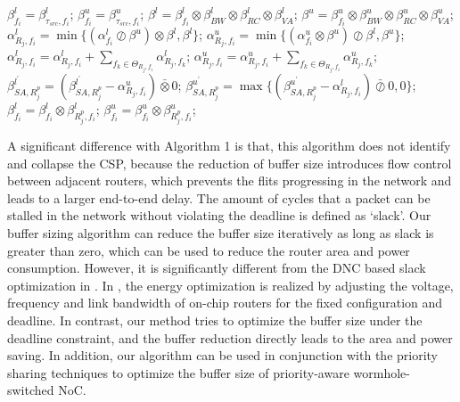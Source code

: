 \documentclass[10pt,journal]{IEEEtran}
\begin{document}
\begin{algorithm}
\begin{algorithmic}[1]
            \ENDIF
        \ENDFOR
        \STATE $\beta_{f_i}^l=\beta_{\tau_{src},f_i}^l$; $\beta_{f_i}^u=\beta_{\tau_{src},f_i}^u$;
                \STATE $\beta^l=\beta^l_{f_i}\otimes\beta_{BW}^l\otimes\beta_{RC}^l\otimes\beta_{VA}^l$;
                \STATE $\beta^u=\beta^u_{f_i}\otimes\beta_{BW}^u\otimes\beta_{RC}^u\otimes\beta_{VA}^u$;
                \STATE $\alpha^l_{R_j,f_i}=\min\{(\alpha^l_{f_i}\oslash\beta^u)\otimes\beta^l,\beta^l\}$;
                \STATE $\alpha^u_{R_j,f_i}=\min\{(\alpha^u_{f_i}\otimes\beta^u)\oslash\beta^l,\beta^u\}$;
                    \STATE $\alpha^l_{R_j,f_i}=\alpha^l_{R_j,f_i}+\sum_{f_k\in\Theta_{R_j,f_i}}\alpha^l_{R_j,f_k}$;
                    \STATE $\alpha^u_{R_j,f_i}=\alpha^u_{R_j,f_i}+\sum_{f_k\in\Theta_{R_j,f_i}}\alpha^u_{R_j,f_k}$;
                    \STATE $\beta^{l^\prime}_{SA,R_j^{p}}=(\beta^{l^\prime}_{SA,R_j^{p}}-\alpha^u_{R_j,f_i})\bar{\otimes}0$;
                    \STATE $\beta^{u^\prime}_{SA,R_j^{p}}=\max\{(\beta^{u^\prime}_{SA,R_j^{p}}-\alpha^l_{R_j,f_i})\bar{\oslash}0,0\}$;
                \ENDIF
            \ENDIF
            \STATE $\beta_{f_i}^l=\beta_{f_i}^l\otimes\beta^l_{R_j^{p},f_i}$; $\beta_{f_i}^u=\beta_{f_i}^u\otimes\beta^u_{R_j^{p},f_i}$;
        \ENDFOR
    \ENDFOR
\end{algorithmic}
\end{algorithm}

A significant difference with Algorithm 1 is that, this algorithm does not identify and collapse the CSP, because the reduction of buffer size introduces flow control between adjacent routers, which prevents the flits progressing in the network and leads to a larger end-to-end delay. The amount of cycles that a packet can be stalled in the network without violating the deadline is defined as `slack'. Our buffer sizing algorithm can reduce the buffer size iteratively as long as slack is greater than zero, which can be used to reduce the router area and power consumption. However, it is significantly different from the DNC based slack optimization in \cite{6560630}. In \cite{6560630}, the energy optimization is realized by adjusting the voltage, frequency and link bandwidth of on-chip routers for the fixed configuration and deadline. In contrast, our method tries to optimize the buffer size under the deadline constraint, and the buffer reduction directly leads to the area and power saving. In addition, our algorithm can be used in conjunction with the priority sharing techniques \cite{5161497} to optimize the buffer size of priority-aware wormhole-switched NoC.
\end{document}

